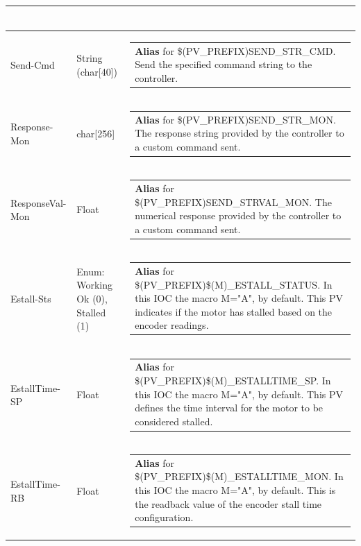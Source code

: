 \documentclass[openany]{article}
\begin{document}
\begin{longtable}{| m{4.5cm} m{2.5cm}  m{8.5cm} |}
\begin{tabular}{@{}m{6cm}@{}}
            \end{tabular} \hypertarget{pv:send-cmd}{}\\ \hline
        Send-Cmd & String (char[40]) & \begin{tabular}{@{}m{6cm}@{}}
                \textbf{\color{blue} Alias} for \$(PV\_PREFIX)SEND\_STR\_CMD. Send the specified command string to the controller.
            \end{tabular} \hypertarget{pv:response-mon}{}\\ \hline
        Response-Mon & char[256] & \begin{tabular}{@{}m{6cm}@{}}
                \textbf{\color{blue} Alias} for \$(PV\_PREFIX)SEND\_STR\_MON. The response string provided by the controller to a custom command sent.
            \end{tabular} \hypertarget{pv:response-val-mon}{}\\ \hline
        ResponseVal-Mon & Float & \begin{tabular}{@{}m{6cm}@{}}
                \textbf{\color{blue} Alias} for \$(PV\_PREFIX)SEND\_STRVAL\_MON. The numerical response provided by the controller to a custom command sent.
            \end{tabular} \hypertarget{pv:estall}{}\\ \hline
        Estall-Sts & Enum: Working Ok (0), Stalled (1) & \begin{tabular}{@{}m{6cm}@{}}
                \textbf{\color{blue} Alias} for \$(PV\_PREFIX)\$(M)\_ESTALL\_STATUS. In this IOC the macro M="A", by default. This PV indicates if the motor has stalled based on the encoder readings.
            \end{tabular} \hypertarget{pv:estall-time}{}\\ \hline
        EstallTime-SP & Float & \begin{tabular}{@{}m{6cm}@{}}
                \textbf{\color{blue} Alias} for \$(PV\_PREFIX)\$(M)\_ESTALLTIME\_SP. In this IOC the macro M="A", by default. This PV defines the time interval for the motor to be considered stalled.
            \end{tabular} \hypertarget{}{}\\ \hline
        EstallTime-RB & Float & \begin{tabular}{@{}m{6cm}@{}}
                \textbf{\color{blue} Alias} for \$(PV\_PREFIX)\$(M)\_ESTALLTIME\_MON. In this IOC the macro M="A", by default. This is the readback value of the encoder stall time configuration.

\end{tabular}
\end{longtable}
\end{document}
